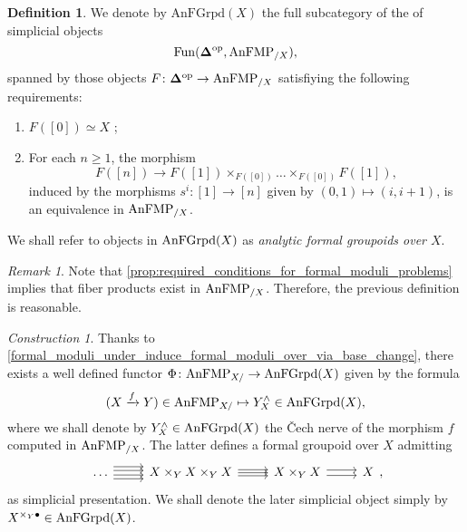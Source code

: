 \documentclass[10pt,a4paper,reqno]{amsart} %
\theoremstyle{plain}
\theoremstyle{definition}
\newtheorem{defin}[thm]{Definition}
\theoremstyle{remark}
\newtheorem{rem}[thm]{Remark}
\numberwithin{equation}{section}
\newtheorem{construction}[thm]{Construction}
\begin{document}
\begin{defin}We denote by
    $\mathrm{AnFGrpd}(X)$ the full subcategory of the \infcat of simplicial objects
        \[
            \operatorname{Fun}( \bm{\Delta} ^\mathrm{op}, \mathrm{AnFMP}_{/X}),
        \]
    spanned by those objects $F \colon \mathbf \Delta ^\mathrm{op} \to \mathrm{AnFMP}_{/X}$ satisfiying the following requirements:
        \begin{enumerate}
            \item $F([0]) \simeq X$ ;
            \item For each $n \ge 1$, the morphism
                \[
                    F([n]) \to F([1]) \times_{F([0])} \dots \times_{F([0])} F([1])  ,
                \]
            induced by the morphisms $s^i \colon [1] \to [n]$ given by $(0,1) \mapsto (i, i+1)$, is an equivalence
            in $\mathrm{AnFMP}_{/X}$.
        \end{enumerate}
    We shall refer to objects in $\mathrm{AnFGrpd}(X)$ as \emph{analytic formal groupoids over $X$}.
\end{defin}

\begin{rem}
    Note that \cref{prop:required_conditions_for_formal_moduli_problems} implies that fiber products exist in $\mathrm{AnFMP}_{/X}$. Therefore, the previous
    definition is reasonable.
\end{rem}



\begin{construction} \label{const:formal_completion_construction_Phi} Thanks to \cref{formal_moduli_under_induce_formal_moduli_over_via_base_change},
there exists a well defined functor $\Phi \colon \mathrm{AnFMP}_{X/} \to \mathrm{AnFGrpd}(X)$ given by the formula
    \[
        (X \xrightarrow{f} Y ) \in \mathrm{AnFMP}_{X/ } \mapsto Y^\wedge_X \in \mathrm{AnFGrpd}(X),
    \]
where we shall denote by $Y^\wedge_X \in \mathrm{AnFGrpd}(X)$ the \v{C}ech nerve of the morphism $f$ computed in $\mathrm{AnFMP}_{/ X}$.
The latter defines a formal groupoid over $X$ admitting
    \[
    \begin{tikzcd}
      \dots \ar[r, shift left=2] \ar[r, shift left=0.75] 
      \ar[r, shift left=-0.75] \ar[r, shift left=-2]
      & X \times_Y X \times_Y X \ar[r, shift left=-1] \ar[r, shift left=1] \ar[r] 
      & X \times_Y X \ar[r, shift left=-0.5ex] \ar[r, shift left=0.5ex] 
      & X 
    \end{tikzcd},
    \] 
as simplicial presentation. We shall denote the later simplicial object simply by $X^{\times_Y \bullet} \in \mathrm{AnFGrpd}(X)$.
\end{construction}
\end{document}
